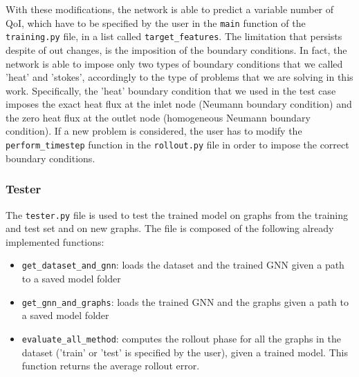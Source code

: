 \documentclass[11pt,a4paper]{article}
\begin{document}
With these modifications, the network is able to predict a variable number of QoI, which have to be specified by the user in the \texttt{main} function of the \texttt{training.py} file, in a list called \texttt{target\_features}. 
The limitation that persists despite of out changes, is the imposition of the boundary conditions. In fact, the network is able to impose only two types of boundary conditions that we called 'heat' and 'stokes', accordingly to the type of problems that we are solving in this work. Specifically, the 'heat' boundary condition that we used in the test case imposes the exact heat flux at the inlet node (Neumann boundary condition) and the zero heat flux at the outlet node (homogeneous Neumann boundary condition). If a new problem is considered, the user has to modify the \texttt{perform\_timestep} function in the \texttt{rollout.py} file in order to impose the correct boundary conditions.
    
\subsubsection*{Tester}
The \texttt{tester.py} file is used to test the trained model on graphs from the training and test set and on new graphs. The file is composed of the following already implemented functions: 
\begin{itemize}
    \item \texttt{get\_dataset\_and\_gnn}: loads the dataset and the trained GNN given a path to a saved model folder
    \item \texttt{get\_gnn\_and\_graphs}: loads the trained GNN and the graphs given a path to a saved model folder
    \item \texttt{evaluate\_all\_method}: computes the rollout phase for all the graphs in the dataset ('train' or 'test' is specified by the user), given a trained model. This function returns the average rollout error. 
\end{itemize}
\end{document}
